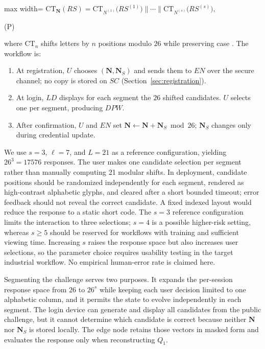 \documentclass[cmc,article,submit,moreauthors,pdftex]{Definitions/tsp}
\renewcommand{\mathsf}[1]{\mathrm{#1}}
\newcommand{\cc}{\mathbin{\|}}
\newcommand{\CT}{\mathsf{CT}}
\newcounter{protoeq}
\newenvironment{ceq}{%
  \refstepcounter{protoeq}%
  \par\vspace{-3pt}\setlength{\topsep}{0pt}\setlength{\partopsep}{0pt}\begin{center}%
}{%
  \hspace{0.45em}\textup{(P\theprotoeq)}%
  \end{center}\vspace{-3pt}%
}
\begin{document}
\begin{ceq}
\begin{adjustbox}{max width=\columnwidth}
$\displaystyle \CT_{\mathbf{N}}(RS)=\CT_{N^{(1)}}\bigl(RS^{(1)}\bigr)\cc\cdots\cc\CT_{N^{(s)}}\bigl(RS^{(s)}\bigr),$
\end{adjustbox}
\end{ceq}

where $\CT_n$ shifts letters by $n$ positions modulo $26$ while preserving case \cite{qowi}. The workflow is:

\begin{enumerate}
\item At registration, $U$ chooses $(\mathbf{N},\mathbf{N}_S)$ and sends them to $EN$ over the secure channel; no copy is stored on $SC$ (Section~\ref{sec:registration}).
\item At login, $LD$ displays for each segment the $26$ shifted candidates. $U$ selects one per segment, producing $DPW$.
\item After confirmation, $U$ and $EN$ set $\mathbf{N}\leftarrow\mathbf{N}+\mathbf{N}_S\bmod26$; $\mathbf{N}_S$ changes only during credential update.
\end{enumerate}

We use $s=3$, $\ell=7$, and $L=21$ as a reference configuration, yielding $26^3=17576$ responses. The user makes one candidate selection per segment rather than manually computing 21 modular shifts. In deployment, candidate positions should be randomized independently for each segment, rendered as high-contrast alphabetic glyphs, and cleared after a short bounded timeout; error feedback should not reveal the correct candidate. A fixed indexed layout would reduce the response to a static short code. The $s=3$ reference configuration limits the interaction to three selections; $s=4$ is a possible higher-risk setting, whereas $s\ge5$ should be reserved for workflows with training and sufficient viewing time. Increasing $s$ raises the response space but also increases user selections, so the parameter choice requires usability testing in the target industrial workflow. No empirical human-error rate is claimed here.

Segmenting the challenge serves two purposes. It expands the per-session response space from $26$ to $26^s$ while keeping each user decision limited to one alphabetic column, and it permits the state to evolve independently in each segment. The login device can generate and display all candidates from the public challenge, but it cannot determine which candidate is correct because neither $\mathbf{N}$ nor $\mathbf{N}_S$ is stored locally. The edge node retains those vectors in masked form and evaluates the response only when reconstructing $Q_1$.
\end{document}
